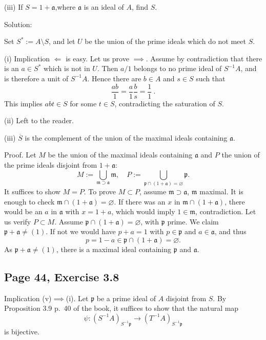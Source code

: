 \documentclass[parskip=half,fontsize=12pt]{scrartcl}%
\newcommand{\mf}{\mathfrak}
\newcommand{\aaa}{\mf a}
\newcommand{\mmm}{\mf m}
\newcommand{\ppp}{\mf p}
\begin{document}
(iii) If $S=1+\aaa$,where $\aaa$ is an ideal of $A$, find $S$.

Solution:

Set $S^*:=A\setminus S$, and let $U$ be the union of the prime ideals which do not meet $S$.

(i) Implication $\Longleftarrow$ is easy. Let us prove $\implies$. Assume by contradiction that there is an $a\in S^*$ which is not in $U$. Then $a/1$ belongs to no prime ideal of $S^{-1}A$, and is therefore a unit of $S^{-1}A$. Hence there are $b\in A$ and $s\in S$ such that 
$$
\frac{ab}1=\frac a1\frac bs=\frac11\ .
$$ 
This implies $abt\in S$ for some $t\in S$, contradicting the saturation of $S$.

(ii) Left to the reader.

(iii) $\overline S$ is the complement of the union of the maximal ideals containing $\aaa$. 

Proof. Let $M$ be the union of the maximal ideals containing $\aaa$ and $P$ the union of the prime ideals disjoint from $1+\aaa$:
$$
M:=\bigcup_{\mmm\supset\aaa}\mmm,\quad P:=\bigcup_{\ppp\cap(1+\aaa)=\varnothing}\ppp.
$$ 
It suffices to show $M=P$. To prove $M\subset P$, assume $\mmm\supset\aaa$, $\mmm$ maximal. It is enough to check $\mmm\cap(1+\aaa)=\varnothing$. If there was an $x$ in $\mmm\cap(1+\aaa)$, there would be an $a$ in $\aaa$ with $x=1+a$, which would imply $1\in\mmm$, contradiction. Let us verify $P\subset M$. Assume $\ppp\cap(1+\aaa)=\varnothing$, with $\ppp$ prime. We claim $\ppp+\aaa\ne(1)$. If not we would have $p+a=1$ with $p\in\ppp$ and $a\in\aaa$, and thus 
$$
p=1-a\in\ppp\cap(1+\aaa)=\varnothing.
$$ 
As $\ppp+\aaa\ne(1)$, there is a maximal ideal containing $\ppp$ and $\aaa$.



\subsection{Page 44, Exercise 3.8}%

Implication (v)$\implies$(i). Let $\ppp$ be a prime ideal of $A$ disjoint from $S$. By Proposition 3.9 p.~40 of the book, it suffices to show that the natural map 
$$
\psi:(S^{-1}A)_{S^{-1}\ppp}\to(T^{-1}A)_{S^{-1}\ppp}
$$ 
is bijective. 
\end{document}
